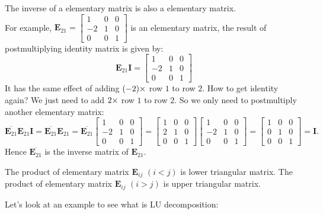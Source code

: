 \begin{proposition}
\item
The inverse of a elementary matrix is also a elementary matrix.\\
For example, $\bm E_{21}=\begin{bmatrix}
1&0&0\\-2&1&0\\0&0&1
\end{bmatrix}$ is an elementary matrix, the result of postmultiplying identity matrix is given by:
\[
\bm E_{21}\bm I=\begin{bmatrix}
1&0&0\\-2&1&0\\0&0&1
\end{bmatrix}
\]
It has the same effect of adding $(-2)\times$ row $1$ to row $2$. How to get identity again? We just need to add $2\times$ row $1$ to row $2$. So we only need to postmultiply another elementary matrix:
\[
\overline{\bm E_{21}}\bm E_{21}\bm I=\overline{\bm E_{21}}\bm E_{21}=\overline{\bm E_{21}}\begin{bmatrix}
1&0&0\\-2&1&0\\0&0&1
\end{bmatrix}
=\begin{bmatrix}
1&0&0\\2&1&0\\0&0&1
\end{bmatrix}\begin{bmatrix}
1&0&0\\-2&1&0\\0&0&1
\end{bmatrix}
=\begin{bmatrix}
1&0&0\\0&1&0\\0&0&1
\end{bmatrix}=\bm I.
\]
Hence $\overline{\bm E_{21}}$ is the inverse matrix of $\bm E_{21}$.
\item
The product of elementary matrix $\bm E_{ij}$ $(i<j)$ is lower triangular matrix. The product of
elementary matrix $\bm E_{ij}$ $(i>j)$ is upper triangular matrix.
\end{proposition}
Let’s look at an example to see what is LU decomposition:
